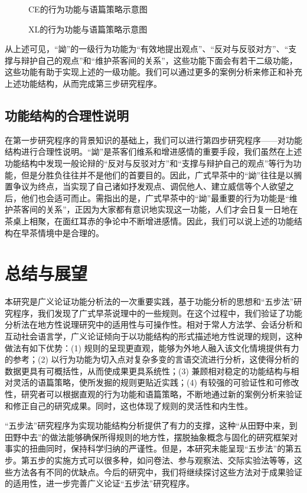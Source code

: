 \documentclass[b5paper,10.5pt,onecolumn,twoside,leqno,UTF8]{article}
\begin{document}
\begin{figure}[h!]

\caption{CE的行为功能与语篇策略示意图}
\end{figure}

\begin{figure}[h!]


\caption{XL的行为功能与语篇策略示意图}
\end{figure}
从上述可见，“詏”的一级行为功能为“有效地提出观点”、“反对与反驳对方”、“支撑与辩护自己的观点”和“维护茶客间的关系”，这些功能下面会有若干二级功能，这些功能有助于实现上述的一级功能。我们可以通过更多的案例分析来修正和补充上述功能结构，从而完成第三步研究程序。


\subsection{功能结构的合理性说明}

在第一步研究程序的背景知识的基础上，我们可以进行第四步研究程序——对功能结构进行合理性说明。“詏”是茶客们维系和增进感情的重要手段，我们虽然在上述功能结构中发现一般论辩的“反对与反驳对方”和“支撑与辩护自己的观点”等行为功能，但是分胜负往往并不是他们的首要目的。因此，广式早茶中的“詏”往往是以搁置争议为终点，当实现了自己诸如抒发观点、调侃他人、建立威信等个人欲望之后，他们也会适可而止。需指出的是，广式早茶中的“詏”最重要的行为功能是“维护茶客间的关系”，正因为大家都有意识地实现这一功能，人们才会日复一日地在茶桌上相聚，在面红耳赤的争论中不断增进感情。因此，我们可以说上述的功能结构在早茶情境中是合理的。

\section{总结与展望}
本研究是广义论证功能分析法的一次重要实践，基于功能分析的思想和“五步法”研究程序，我们发现了广式早茶说理中的一些规则。在这个过程中，我们验证了功能分析法在地方性说理研究中的适用性与可操作性。相对于常人方法学、会话分析和互动社会语言学，广义论证倾向于以功能结构的形式描述地方性说理的规则，这种做法有如下优势：(1) 规则的呈现更直观，能够为外地人融入该文化情境提供有力的参考；(2) 以行为功能为切入点对复杂多变的言语交流进行分析，这使得分析的数据更具有可概括性，从而使成果更具系统性；(3) 兼顾相对稳定的功能结构与相对灵活的语篇策略，使所发掘的规则更贴近实践；(4) 有较强的可验证性和可修改性，研究者可以根据直观的行为功能和语篇策略，不断地通过新的案例分析来验证和修正自己的研究成果。同时，这也体现了规则的灵活性和内生性。

“五步法”研究程序为实现功能结构分析提供了有力的支撑，这种“从田野中来，到田野中去”的做法能够确保所得规则的地方性，摆脱抽象概念与固化的研究框架对事实的扭曲同时，保持科学归纳的严谨性。但是，本研究未能呈现“五步法”的第五步。第五步的实施方式可以很多种，如问卷法、参与观察法、交际实验法等等，这些方法各有不同的优缺点。今后的研究中，我们将继续探讨这些方法对于成果验证的适用性，进一步完善广义论证“五步法”研究程序。
\end{document}
